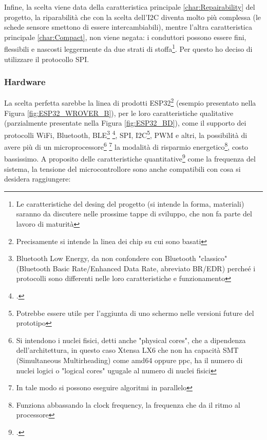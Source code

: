 \documentclass[a4paper, 10pt, final]{article} %
\newcommand{\parenciteit}[2]{\textit{\parencite[#1]{#2}}} %
\begin{document}
    \noindent Infine, la scelta viene data della caratteristica principale \ref{char:Repairability} del progetto, la riparabilit\`{a} che con la scelta dell'I2C diventa molto pi\`{u} complessa (le schede sensore smettono di essere intercambiabili), mentre l'altra caratteristica principale \ref{char:Compact}, non viene negata: i conduttori possono essere fini, flessibili e nascosti leggermente da due strati di stoffa\footnote{Le caratteristiche del desing del progetto (si intende la forma, materiali) saranno da discutere nelle prossime tappe di sviluppo, che non fa parte del lavoro di maturit\`{a}}. Per questo ho deciso di utilizzare il protocollo SPI.

    \subsubsection{Hardware}\label{sec:MotherboardDesignHardware}
    La scelta perfetta sarebbe la linea di prodotti ESP32\footnote{Precisamente si intende la linea dei chip su cui sono basati} (esempio presentato nella Figura \ref{fig:ESP32_WROVER_B}), per le loro caratteristiche qualitative (parzialmente presentate nella Figura \ref{fig:ESP32_BD}), come il supporto dei protocolli WiFi, Bluetooth, BLE\footnote{Bluetooth Low Energy, da non confondere con Bluetooth "classico" (Bluetooth Basic Rate/Enhanced Data Rate, abreviato BR/EDR) perche\'{e} i protocolli sono differenti nelle loro caratteristiche e funzionamento} \footcite[]{BLE:Wiki}, SPI, I2C\footnote{Potrebbe essere utile per l'aggiunta di uno schermo nelle versioni future del prototipo}, PWM e altri, la possibilit\`{a} di avere pi\`{u} di un microprocessore\footnote{Si intendono i nuclei fisici, detti anche "physical cores", che a dipendenza dell'architettura, in questo caso Xtensa LX6 che non ha capacit\`{a} SMT (Simultaneous Multirheading) \parenciteit{}{CPUSMT:Wiki} come amd64 oppure ppc, ha il numero di nuclei logici o "logical cores" ugugale al numero di nuclei fisici} \footnote{In tale modo si possono eseguire algoritmi in parallelo} la modalit\`{a} di risparmio energetico\footnote{Funziona abbassando la clock frequency, la frequenza che da il ritmo al processore}, costo bassissimo.
    A proposito delle caratteristiche quantitative\footcite[]{ESP32:Datasheet} come la frequenza del sistema, la tensione del microcontrollore sono anche compatibili con cosa si desidera raggiungere:
\end{document}
